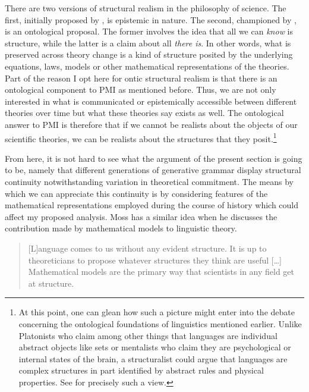 \documentclass[output=paper]{langscibook}
\begin{document}
There are two versions of structural realism in the philosophy of science. The first, initially proposed by \cite{Worall1989}, is epistemic in nature. The second, championed by \cite{French2003}, is an ontological proposal. The former involves the idea that all we can \emph{know} is structure, while the latter is a claim about all \emph{there is}. In other words, what is preserved across theory change is a kind of structure posited by the underlying equations, laws, models or other mathematical representations of the theories. Part of the reason I opt here for ontic structural realism is that there is an ontological component to PMI as mentioned before. Thus, we are not only interested in what is communicated or epistemically accessible between different theories over time but what these theories say exists as well. The ontological answer to PMI is therefore that if we cannot be realists about the objects of our scientific theories, we can be realists about the structures that they posit.\footnote{At this point, one can glean how such a picture might enter into the debate concerning the ontological foundations of linguistics mentioned earlier. Unlike Platonists who claim among other things that languages are individual abstract objects like sets or mentalists who claim they are psychological or internal states of the brain, a structuralist could argue that languages are complex structures in part identified by abstract rules and physical properties. See \cite{Nefdt:2018} for precisely such a view.}  

From here, it is not hard to see what the argument of the present section is going to be, namely that different generations of generative grammar display structural continuity notwithstanding variation in theoretical commitment. The means by which we can appreciate this continuity is by considering features of the mathematical representations employed during the course of history which could affect my proposed analysis. Moss has a similar idea when he discusses the contribution made by mathematical models to linguistic theory. 

\begin{quote}
[L]anguage comes to us without any evident structure. It is up to theoreticians to propose whatever structures they think are useful […] Mathematical models are the primary way that scientists in any field get at structure. \citep[534]{Moss2012}
\end{quote}
\end{document}
